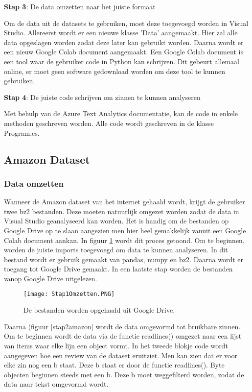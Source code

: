\textbf{Stap 3}: De data omzetten naar het juiste formaat

Om de data uit de datasets te gebruiken, moet deze toegevoegd worden in Visual Studio. Allereerst wordt er een nieuwe klasse 'Data' aangemaakt. Hier zal alle data opgeslagen worden zodat deze later kan gebruikt worden. Daarna wordt er een nieuw Google Colab document aangemaakt. Een Google Colab document is een tool waar de gebruiker code in Python kan schrijven. Dit gebeurt allemaal online, er moet geen software gedownload worden om deze tool te kunnen gebruiken. 

\textbf{Stap 4}: De juiste code schrijven om zinnen te kunnen analyseren

Met behulp van de Azure Text Analytics documentatie, kan de code in enkele methoden geschreven worden. Alle code wordt geschreven in de klasse Program.cs. 

\subsection{Amazon Dataset}
\label{amazondatasetazure}

\subsubsection{Data omzetten}
\label{amazondatasetomzettenazure}
Wanneer de Amazon dataset van het internet gehaald wordt, krijgt de gebruiker twee \gls{bz2} bestanden. Deze moeten natuurlijk omgezet worden zodat de data in Visual Studio geanalyseerd kan worden. Het is handig om de bestanden op Google Drive op te slaan aangezien men hier heel gemakkelijk vanuit een Google Colab document aankan. In figuur \ref{stap1amazon} wordt dit proces getoond. Om te beginnen, worden de juiste imports toegevoegd om data te kunnen analyseren. In dit bestand wordt er gebruik gemaakt van \gls{pandas}, \gls{numpy} en \gls{bz2}. Daarna wordt er toegang tot Google Drive gemaakt. In een laatste stap worden de bestanden vanop Google Drive uitgelezen.

\begin{figure}[!htbp]
    \texttt{[image: Stap1Omzetten.PNG]}
    \caption{\label{stap1amazon}De bestanden worden opgehaald uit Google Drive.}
\end{figure}
\FloatBarrier

Daarna (figuur \ref{stap2amazon} wordt de data omgevormd tot bruikbare zinnen. Om te beginnen wordt de data via de functie readlines() omgezet naar een lijst van items waar elke lijn een object vormt. In het tweede blokje code wordt aangegeven hoe een review van de dataset eruitziet. Men kan zien dat er voor elke zin nog een b staat. Deze b staat er door de functie readlines(). Byte objecten beginnen steeds met een b. Deze b moet weggefilterd worden, zodat de data naar tekst omgevormd wordt. 


